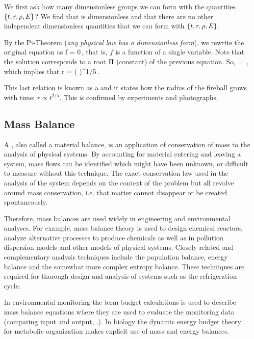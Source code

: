 We first ask how many dimensionless groups we can form with the quantities $\left\lbrace{t, r, \rho, E}\right\rbrace$? We find that
\beq
{}
\eeq
is dimensionless and that there are no other independent dimensionless quantities that we can form with $\left\lbrace{t, r, \rho, E}\right\rbrace$.

By the Pi-Theorem (\emph{any physical law has a dimensionless form}), we rewrite the original equation as
\beq
f = 0\,,
\eeq
that is, $f$ is a function of a single variable. Note that the solution corresponds to a root $\Pi$ (constant) of the previous equation. So, 
\beq
\kdim = \,,
\eeq
which implies that
\beq
r = \left( \kdim{} \right)^{1/5}\,.
\eeq

This last relation is known as a  and it states how the radius of the fireball grows with time: $r \propto t^{2/5}$. This is confirmed by experiments and photographs.


\subsection{Mass Balance}
A , also called a material balance, is an application of conservation of mass to the analysis of physical systems. By accounting for material entering and leaving a system, mass flows can be identified which might have been unknown, or difficult to measure without this technique. The exact conservation law used in the analysis of the system depends on the context of the problem but all revolve around mass conservation, i.e. that matter cannot disappear or be created spontaneously.

Therefore, mass balances are used widely in engineering and environmental analyses. For example, mass balance theory is used to design chemical reactors, analyze alternative processes to produce chemicals as well as in pollution dispersion models and other models of physical systems. Closely related and complementary analysis techniques include the population balance, energy balance and the somewhat more complex entropy balance. These techniques are required for thorough design and analysis of systems such as the refrigeration cycle.

In environmental monitoring the term budget calculations is used to describe mass balance equations where they are used to evaluate the monitoring data (comparing input and output, \etc.). In biology the dynamic energy budget theory for metabolic organization makes explicit use of mass and energy balances.


